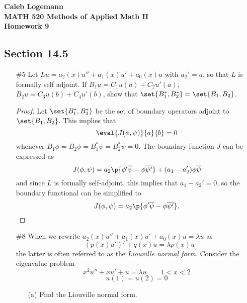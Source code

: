\documentclass[11pt, oneside]{article}
\begin{document}
\noindent \textbf{\Large{Caleb Logemann \\
MATH 520 Methods of Applied Math II \\
Homework 9
}}

\subsection*{Section 14.5}
\begin{enumerate}
  \item[\#5]
    Let $Lu = a_2(x) u'' + a_1(x)u' + a_0(x) u$ with $a_2' = a$, so that $L$ is
    formally self adjoint.
    If $B_1 u = C_1 u(a) + C_2u'(a)$, $B_2 u = C_3u(b) + C_4u'(b)$, show that
    $\set{B_1^*, B_2^*} = \set{B_1, B_2}$.

    \begin{proof}
      Let $\set{B_1^*, B_2^*}$ be the set of boundary operators adjoint to
      $\set{B_1, B_2}$.
      This implies that
      \[
        \eval{J(\phi, \psi)}{a}{b} = 0
      \]
      whenever $B_1 \phi = B_2 \phi = B_1^* \psi = B_2^* \psi = 0$.
      The boundary function $J$ can be expressed as
      \[
        J(\phi, \psi) = a_2\p{\phi' \overline{\psi} - \phi \overline{\psi'}} + (a_1 - a_2') \phi \overline{\psi}
      \]
      and since $L$ is formally self-adjoint, this implies that $a_1 - a_2' = 0$,
      so the boundary functional can be simplified to
      \[
        J(\phi, \psi) = a_2\p{\phi' \overline{\psi} - \phi \overline{\psi'}}.
      \]
    \end{proof}

  \pagebreak
  \item[\#8]
    When we rewrite $a_2(x) u'' + a_1(x) u' + a_0(x) u = \lambda u$ as
    \[
      -(p(x)u')' + q(x)u = \lambda \rho(x) u
    \]
    the latter is often referred to as the \textit{Liouville normal form}.
    Consider the eigenvalue problem
    \[
      x^2 u'' + xu' + u = \lambda u \qquad 1 < x < 2
    \]
    \[
      u(1) = u(2) = 0
    \]
    \begin{enumerate}
      \item[(a)] %
        Find the Liouville normal form.


\end{enumerate}
\end{enumerate}
\end{document}
